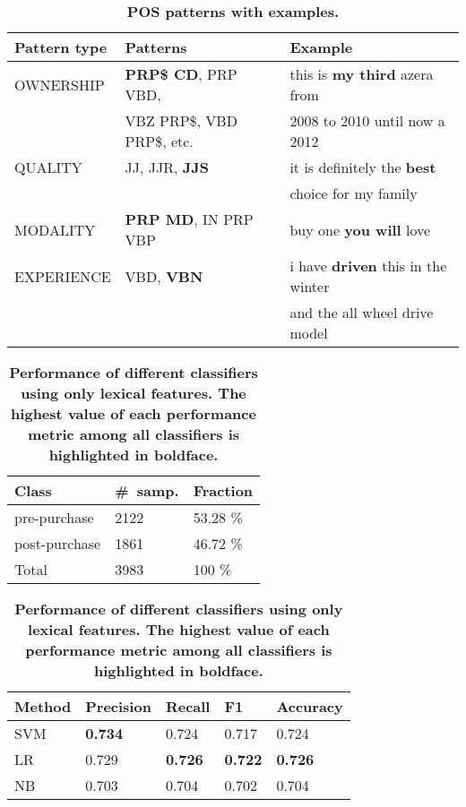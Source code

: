 \documentclass[runningheads,a4paper]{llncs}
\begin{document}
\begin{table}
\caption{\label{tab:pos_pats}\textbf{POS patterns with examples.}}
\centering
\begin{tabular} { |l|l|l| }
 \hline\hline
 {\bf Pattern type} & {\bf Patterns} & {\bf Example} \\
  \hline
  OWNERSHIP & {\bf PRP\$ CD}, PRP VBD, & this is {\bf my third} azera from \\
            & VBZ PRP\$, VBD PRP\$, etc. & 2008 to 2010 until now a 2012 \\
  \hline
  QUALITY & JJ, JJR, {\bf JJS} & it is definitely the {\bf best} \\& &choice for my family \\
  \hline
  MODALITY & {\bf PRP MD}, IN PRP VBP & buy one {\bf you will} love \\
  \hline
  EXPERIENCE & VBD, {\bf VBN} & i have {\bf driven} this in the winter \\&& and the all wheel drive model \\
  \hline\hline
\end{tabular}
\end{table}

\begin{table}
\parbox{0.40\linewidth}{
\caption{\label{tab:data_dist}\textbf{Distribution of classes in experimental dataset.}}
\centering
\begin{tabular} {|l|l|l|}
\hline\hline
{\bf Class} & {\bf \#~samp.} & {\bf Fraction} \\
\hline
pre-purchase & 2122 & 53.28 \% \\
\hline
post-purchase & 1861 & 46.72 \% \\
\hline
Total & 3983 & 100 \% \\
\hline\hline
\end{tabular}
}
\hfill
\parbox{0.55\linewidth}{
\caption{\label{tab:prepost_perf}\textbf{Performance of different classifiers using only lexical features. The highest value of each performance metric among all classifiers is
highlighted in boldface.}}
\centering
\begin{tabular} { |l|l|l|l|l| }
\hline\hline
{\bf Method} & {\bf Precision}  & {\bf Recall} & {\bf F1 } & {\bf Accuracy} \\
\hline
SVM & {\bf 0.734 }  & 0.724 & 0.717 & 0.724 \\
\hline
LR & 0.729 & {\bf 0.726 } & {\bf 0.722} & {\bf 0.726 }  \\
\hline
NB & 0.703 & 0.704 & 0.702 & 0.704  \\
\hline\hline
\end{tabular}
}
\end{table}
\end{document}
